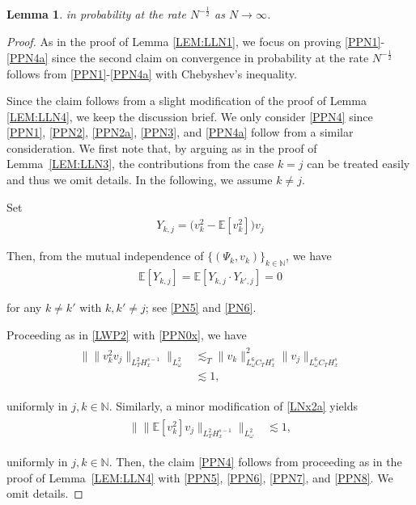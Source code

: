 \documentclass[letterpaper, 11pt,  reqno]{amsart}
\newtheorem{lemma}[theorem]{Lemma}
\newcommand{\1}{\hspace{0.5mm}\text{I}\hspace{0.2mm}}
\newcommand{\noi}{\noindent}
\newcommand{\N}{\mathbb{N}}
\newcommand{\E}{\mathbb{E}}
\newcommand{\les}{\lesssim}
\renewcommand{\o}{\omega}
\numberwithin{equation}{section}
\numberwithin{theorem}{section}
\begin{document}
\begin{lemma}
\noi
in probability
at the rate $N^{-\frac 12 }$
as $N \to \infty$.













%

\end{lemma}


\begin{proof}
As in the proof of Lemma \ref{LEM:LLN1}, 
we focus on proving \eqref{PPN1}-\eqref{PPN4a}
 since the second claim on convergence in probability at the rate $N^{-\frac 12 }$
follows from 
\eqref{PPN1}-\eqref{PPN4a}
 with Chebyshev's inequality.



Since the claim follows from a slight modification of the proof of Lemma \ref{LEM:LLN4}, 
we keep the discussion brief.
We only consider \eqref{PPN4}  since \eqref{PPN1}, \eqref{PPN2}, 
\eqref{PPN2a}, \eqref{PPN3}, 
and \eqref{PPN4a} follow
from a similar consideration.
We first note that, by arguing as in  
 the proof of Lemma~\ref{LEM:LLN3}, 
the contributions from the case $k = j$
can be treated easily and thus we omit details.
In the following, 
we assume $k \ne j$.


Set
\begin{align}
Y_{k, j}= \Big( v_k^2 - \E [v_k^2] \Big) v_j
\label{PPN5}
\end{align}

\noi
Then, 
from the mutual independence of $\{(\Psi_k, v_k)\}_{k \in \N}$, 
we have
\begin{align}
\E[Y_{k, j}] = 
\E[Y_{k, j}\cdot Y_{k', j}]= 0
\label{PPN6}
\end{align}

\noi
for any $k \ne k'$ with $k, k' \ne j$;
see \eqref{PN5} and \eqref{PN6}.

Proceeding as in \eqref{LWP2} with %
 \eqref{PPN0x},  we have
\begin{align}
\begin{split}
\Big\| \|  v_k^2 v_j \|_{L_T^2 H_x^{s-1}} \Big\|_{L^2_\o}
&\les_T 
  \| v_k \|^2_{L^6_\o C_T  H_x^{s}}
   \| v_j \|_{L^6_\o C_T  H_x^{s}}\\
 & \les 1,  
\end{split}
\label{PPN7}
\end{align}


\noi
uniformly in $j, k \in \N$.
Similarly, 
a minor modification of \eqref{LNx2a} yields
\begin{align}
\begin{split}
\Big\| \|\E[  v_k^2 ]v_j \|_{L_T^2 H_x^{s-1}} \Big\|_{L^2_\o}
 & \les 1,  
\end{split}
\label{PPN8}
\end{align}



\noi
uniformly in $j, k \in \N$.
Then, the claim \eqref{PPN4} follows 
from proceeding as in the proof of Lemma~\ref{LEM:LLN4}
with \eqref{PPN5}, \eqref{PPN6}, \eqref{PPN7}, and \eqref{PPN8}.
We omit details.
\end{proof}
\end{document}
